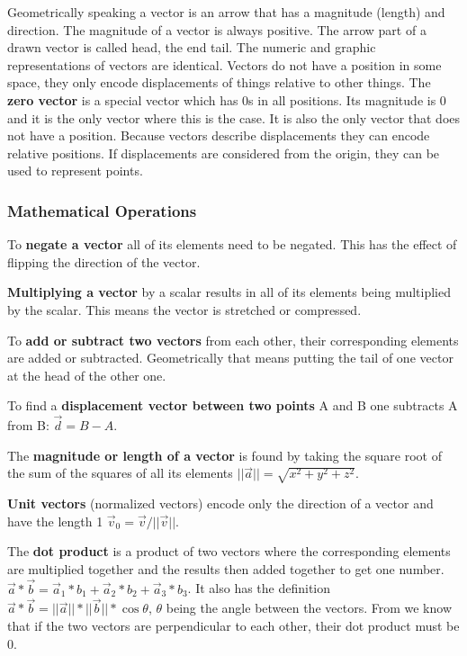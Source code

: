 \documentclass[a4paper,11pt]{amsart}
\begin{document}
Geometrically speaking a vector is an arrow that has a magnitude (length) and 
direction. The magnitude of a vector is always positive. The arrow part of
a drawn vector is called head, the end tail. The numeric and graphic
representations of vectors are identical. Vectors do not have a position in
some space, they only encode displacements of things relative to other things. 
The \textbf{zero vector} is a special vector which has 0s in all positions. Its
magnitude is 0 and it is the only vector where this is the case. It is also the
only vector that does not have a position. Because vectors describe 
displacements they can encode relative positions. If displacements are 
considered from the origin, they can be used to represent points.

\subsubsection{Mathematical Operations}

To \textbf{negate a vector} all of its elements need to be negated. This has 
the effect of flipping the direction of the vector.  

\textbf{Multiplying a vector} by a scalar results in all of its elements being 
multiplied by the scalar. This means the vector is stretched or compressed.  

To \textbf{add or subtract two vectors} from each other, their corresponding 
elements are added or subtracted. Geometrically that means putting the tail of 
one vector at the head of the other one. 

To find a \textbf{displacement vector between two points} A and B one subtracts 
A from B: $\vec d = B - A$.

The \textbf{magnitude or length of a vector} is found by taking the square root 
of the sum of the squares of all its elements $||\vec a|| = \sqrt{x^2 + y^2 + 
z^2}$.

\textbf{Unit vectors} (normalized vectors) encode only the direction of a 
vector and have the length 1 $\vec v_0 = \vec v / ||\vec v||$. 

The \textbf{dot product} is a product of two vectors where the corresponding 
elements are multiplied together and the results then added together to get one 
number. $\vec a * \vec b = \vec a_1 * b_1 + \vec a_2 * b_2 + \vec a_3 * b_3$. 
It also has the definition $\vec a * \vec b = ||\vec a|| * ||\vec b|| * 
\cos{\theta}$, $\theta$ being the angle between the vectors. From we know that 
if the two vectors are perpendicular to each other, their dot product must be 
0. 
\end{document}
